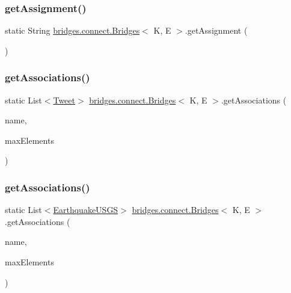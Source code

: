 \subsubsection{\texorpdfstring{get\+Assignment()}{getAssignment()}}
{\footnotesize\ttfamily static String \hyperlink{classbridges_1_1connect_1_1_bridges}{bridges.\+connect.\+Bridges}$<$ K, E $>$.get\+Assignment (\begin{DoxyParamCaption}{ }\end{DoxyParamCaption})\hspace{0.3cm}{\ttfamily [static]}}

\hypertarget{classbridges_1_1connect_1_1_bridges_ad8f145f95222730fad3c0628b42f0128}{}\label{classbridges_1_1connect_1_1_bridges_ad8f145f95222730fad3c0628b42f0128} 
\subsubsection{\texorpdfstring{get\+Associations()}{getAssociations()}\hspace{0.1cm}{\footnotesize\ttfamily [1/2]}}
{\footnotesize\ttfamily static List$<$\hyperlink{classbridges_1_1data__src__dependent_1_1_tweet}{Tweet}$>$ \hyperlink{classbridges_1_1connect_1_1_bridges}{bridges.\+connect.\+Bridges}$<$ K, E $>$.get\+Associations (\begin{DoxyParamCaption}\item[{\hyperlink{classbridges_1_1data__src__dependent_1_1_twitter_account}{Twitter\+Account}}]{name,  }\item[{int}]{max\+Elements }\end{DoxyParamCaption})\hspace{0.3cm}{\ttfamily [static]}}

\hypertarget{classbridges_1_1connect_1_1_bridges_ac02211d6205c1270df11fcc271982d40}{}\label{classbridges_1_1connect_1_1_bridges_ac02211d6205c1270df11fcc271982d40} 
\subsubsection{\texorpdfstring{get\+Associations()}{getAssociations()}\hspace{0.1cm}{\footnotesize\ttfamily [2/2]}}
{\footnotesize\ttfamily static List$<$\hyperlink{classbridges_1_1data__src__dependent_1_1_earthquake_u_s_g_s}{Earthquake\+U\+S\+GS}$>$ \hyperlink{classbridges_1_1connect_1_1_bridges}{bridges.\+connect.\+Bridges}$<$ K, E $>$.get\+Associations (\begin{DoxyParamCaption}\item[{\hyperlink{classbridges_1_1data__src__dependent_1_1_u_s_g_saccount}{U\+S\+G\+Saccount}}]{name,  }\item[{int}]{max\+Elements }\end{DoxyParamCaption})\hspace{0.3cm}{\ttfamily [static]}}

